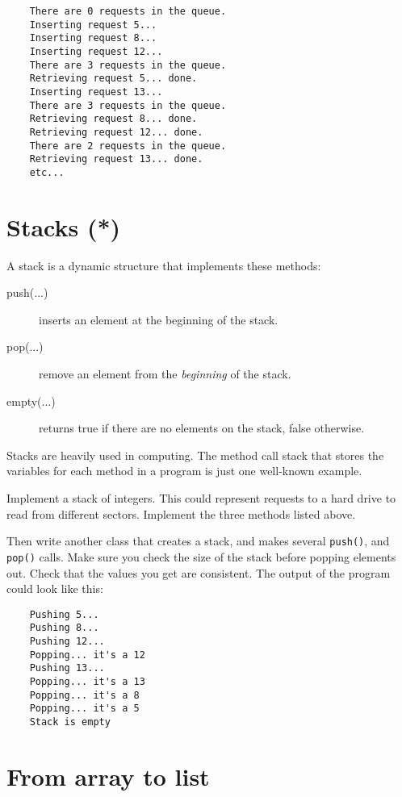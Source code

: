 \documentclass{article}
\begin{document}
\begin{verbatim}
    There are 0 requests in the queue.
    Inserting request 5...
    Inserting request 8...
    Inserting request 12...
    There are 3 requests in the queue.
    Retrieving request 5... done. 
    Inserting request 13...
    There are 3 requests in the queue.
    Retrieving request 8... done. 
    Retrieving request 12... done. 
    There are 2 requests in the queue.
    Retrieving request 13... done. 
    etc...
\end{verbatim}

\section{Stacks (*)}
\label{sec:stack}

A stack is a dynamic structure that implements these methods: 

\begin{description}
\item[push(...)] inserts an element at the beginning of the stack.
\item[pop(...) ] remove an element from the \emph{beginning} of the stack.
\item[empty(...) ] returns true if there are no elements on the stack,
  false otherwise.
\end{description}

Stacks are heavily used in computing. The method call stack that
stores the variables for each method in a program is just one
well-known example. 

Implement a stack of integers. This could represent requests
to a hard drive to read from different sectors. Implement the three
methods listed above. 

Then write another class that creates a stack, and makes several
\verb+push()+, and \verb+pop()+ calls. Make sure you check the size of
the stack before popping elements out. Check
that the values you get are consistent. The output of the program
could look like this: 

\begin{verbatim}
    Pushing 5...
    Pushing 8...
    Pushing 12...
    Popping... it's a 12
    Pushing 13...
    Popping... it's a 13
    Popping... it's a 8
    Popping... it's a 5
    Stack is empty
\end{verbatim}

\section{From array to list}
\label{sec:from-array-string}
\end{document}
